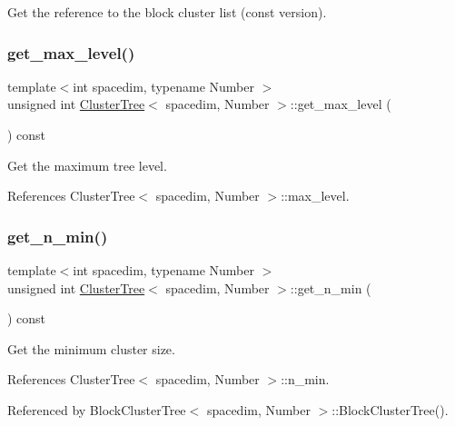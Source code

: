 Get the reference to the block cluster list (const version). \mbox{\label{classClusterTree_a3c1125039b1915ebad94247d6888df31}} 
\subsubsection{\texorpdfstring{get\+\_\+max\+\_\+level()}{get\_max\_level()}}
{\footnotesize\ttfamily template$<$int spacedim, typename Number $>$ \\
unsigned int \hyperlink{classClusterTree}{Cluster\+Tree}$<$ spacedim, Number $>$\+::get\+\_\+max\+\_\+level (\begin{DoxyParamCaption}{ }\end{DoxyParamCaption}) const}

Get the maximum tree level. 

References Cluster\+Tree$<$ spacedim, Number $>$\+::max\+\_\+level.

\mbox{\label{classClusterTree_a403e59575a89a3e86e8d7092a8815aa5}} 
\subsubsection{\texorpdfstring{get\+\_\+n\+\_\+min()}{get\_n\_min()}}
{\footnotesize\ttfamily template$<$int spacedim, typename Number $>$ \\
unsigned int \hyperlink{classClusterTree}{Cluster\+Tree}$<$ spacedim, Number $>$\+::get\+\_\+n\+\_\+min (\begin{DoxyParamCaption}{ }\end{DoxyParamCaption}) const}

Get the minimum cluster size. 

References Cluster\+Tree$<$ spacedim, Number $>$\+::n\+\_\+min.



Referenced by Block\+Cluster\+Tree$<$ spacedim, Number $>$\+::\+Block\+Cluster\+Tree().

\mbox{\label{classClusterTree_af80051449b7324121fb0a27d5ce7c9a1}} 
